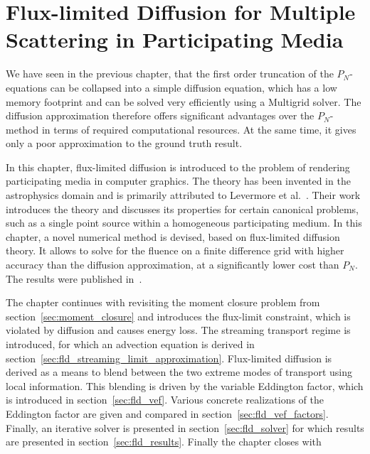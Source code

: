 \chapter{Flux-limited Diffusion for Multiple Scattering in Participating Media}
\label{sec:fld}

We have seen in the previous chapter, that the first order truncation of the $P_N$-equations can be collapsed into a simple diffusion equation, which has a low memory footprint and can be solved very efficiently using a Multigrid solver. The diffusion approximation therefore offers significant advantages over the $P_N$-method in terms of required computational resources. At the same time, it gives only a poor approximation to the ground truth result.

In this chapter, flux-limited diffusion is introduced to the problem of rendering participating media in computer graphics. The theory has been invented in the astrophysics domain and is primarily attributed to Levermore et al.~\cite{Levermore81}. Their work introduces the theory and discusses its properties for certain canonical problems, such as a single point source within a homogeneous participating medium. In this chapter, a novel numerical method is devised, based on flux-limited diffusion theory. It allows to solve for the fluence on a finite difference grid with higher accuracy than the diffusion approximation, at a significantly lower cost than $P_N$. The results were published in~\cite{Koerner14}.

The chapter continues with revisiting the moment closure problem from section~\ref{sec:moment_closure} and introduces the flux-limit constraint, which is violated by diffusion and causes energy loss. The streaming transport regime is introduced, for which an advection equation is derived in section~\ref{sec:fld_streaming_limit_approximation}. Flux-limited diffusion is derived as a means to blend between the two extreme modes of transport using local information. This blending is driven by the variable Eddington factor, which is introduced in section~\ref{sec:fld_vef}. Various concrete realizations of the Eddington factor are given and compared in section~\ref{sec:fld_vef_factors}. Finally, an iterative solver is presented in section~\ref{sec:fld_solver} for which results are presented in section~\ref{sec:fld_results}. Finally the chapter closes with 













